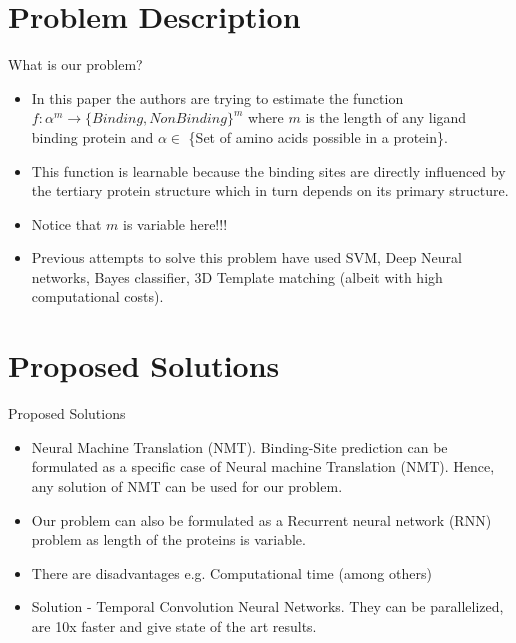 \documentclass{beamer}
\begin{document}
\section{Problem Description}

\begin{frame}[t]{What is our problem?}
\begin{itemize}
\item In this paper the authors are trying to estimate the function
$f:\mathbb \alpha^m \to \{Binding, NonBinding\}^m$
where $m$ is the length of any ligand binding protein and $\alpha \in $
\{Set of amino acids possible in a protein\}.

\item This function is learnable because the binding sites are directly influenced by the tertiary protein structure which in turn depends on its primary structure.

\item Notice that $m$ is variable here!!!

\item Previous attempts to solve this problem have used
SVM, Deep Neural networks, Bayes classifier, 3D Template matching (albeit with high computational costs).
\end{itemize}
\end{frame}

\section{Proposed Solutions}

\begin{frame}[t]{Proposed Solutions}

\begin{itemize}
\item Neural Machine Translation (NMT).
Binding-Site prediction can be formulated as a specific case of Neural machine Translation (NMT).
Hence, any solution of NMT can be used for our problem.
\item Our problem can also be formulated as a Recurrent neural network (RNN) problem as length of the proteins is variable.
\item There are disadvantages e.g. Computational time (among others)

\item Solution - Temporal Convolution Neural Networks.
They can be parallelized, are 10x faster and give state of the art results.

\end{itemize}
\end{frame}
\end{document}
